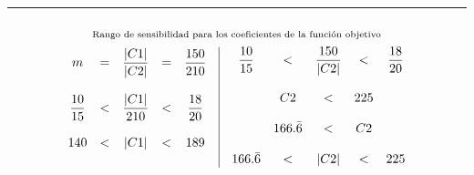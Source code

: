 \documentclass[12pt]{article}
\begin{document}
\vspace{1cm}
\noindent\rule{\textwidth}{0.4pt}
\vspace{0.5cm}

\[\overset{\text{Rango de sensibilidad para los coeficientes de la función objetivo}\vphantom{\Big|}}{
  \begin{array}{c|c}
    \begin{array}{c c c c c}
      m & = & \dfrac{\left|C1\right|}{\left|C2\right|} & = & \dfrac{150}{210} \\\\
      \dfrac{10}{15} & < & \dfrac{\left|C1\right|}{210} & < & \dfrac{18}{20} \\\\
      140 & < & \left|C1\right| & < & 189 \\\\
    \end{array}
    &
    \begin{array}{c c c c c}
      \dfrac{10}{15} & < & \dfrac{150}{\left|C2\right|} & < & \dfrac{18}{20} \\\\
      & C2 & < & 225 & \\\\
      & 166.\bar{6} & < & C2 & \\\\
      166.\bar{6} & < & \left|C2\right| & < & 225 
    \end{array}
  \end{array}
}\]
\end{document}
